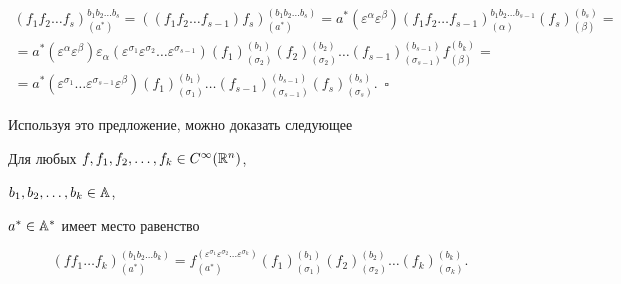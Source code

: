 \begin{multline*} 


(f_1f_2\dotsc f_s)^{b_1b_2\dotsc b_s}_{(a^*)}= 


((f_1f_2\dotsc f_{s-1})f_s)^{(b_1b_2\dotsc b_s)}_{(a^*)}= 


a^*(\varepsilon^\alpha\varepsilon^\beta)(f_1f_2\dotsc f_{s-1} 


)^{b_1b_2\dotsc b_{s-1}}_{(\alpha)}(f_s)^{(b_s)}_{(\beta)}= \\ 


% 


=a^*(\varepsilon^\alpha\varepsilon^\beta)\varepsilon_\alpha 


(\varepsilon^{\sigma_1}\varepsilon^{\sigma_2}\dotsc 


\varepsilon^{\sigma_{s-1}})(f_1)^{(b_1)}_{(\sigma_2)} 


(f_2)^{(b_2)}_{(\sigma_2)}\dotsc (f_{s-1} 


)^{(b_{s-1})}_{(\sigma_{s-1})}f^{(b_k)}_{(\beta)}= \\


%


=a^*(\varepsilon^{\sigma_1}\dotsc\varepsilon^{\sigma_{s-1}} 


\varepsilon^\beta)(f_1)^{(b_1)}_{(\sigma_1)}\dotsc 


(f_{s-1})^{(b_{s-1})}_{(\sigma_{s-1})}


(f_s)^{(b_s)}_{(\sigma_s)}.\ \;\square 


\end{multline*} 


 


Используя это предложение, можно доказать следующее  


 


\begin{props} Для любых $f,f_1,f_2,\dotsc,f_k\in C^\infty(\Bbb R^n)$, 


$b_1,b_2,\dotsc,b_k\in\Bbb A$, 


$a^*\in\Bbb A^*$ имеет место равенство 


$$ 


(f f_1\dotsc f_k)^{(b_1b_2\dotsc b_k)}_{(a^*)}= 


f^{(\varepsilon^{\sigma_1}\varepsilon^{\sigma_2}\dotsc 


\varepsilon^{\sigma_k})}_{(a^*)}(f_1)^{(b_1)}_{(\sigma_1)} 


(f_2)^{(b_2)}_{(\sigma_2)}\dotsc(f_k)^{(b_k)}_{(\sigma_k)}. 


$$ 


\end{props} 


